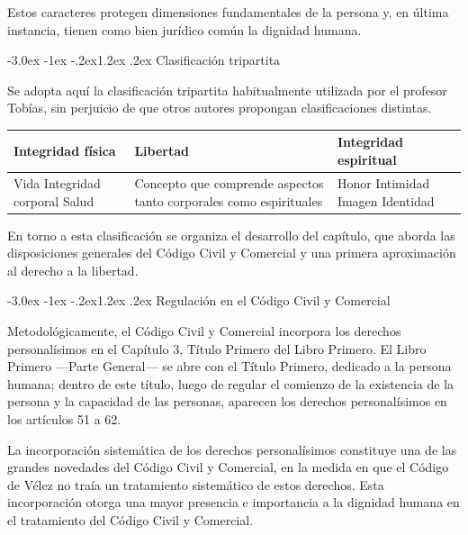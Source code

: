 \documentclass[12pt,oneside]{book}
\makeatletter
\renewcommand\section{\@startsection{section}{1}{\z@}%
  {-3.0ex \@plus -1ex \@minus -.2ex}{1.2ex \@plus .2ex}%
  {\normalfont\large\bfseries\color{acento}}}
\makeatother
\begin{document}
\begin{importante}
Estos caracteres protegen dimensiones fundamentales de la persona y, en última instancia, tienen como bien jurídico común la dignidad humana.
\end{importante}

\section{Clasificación tripartita}

Se adopta aquí la clasificación tripartita habitualmente utilizada por el profesor Tobías, sin perjuicio de que otros autores propongan clasificaciones distintas.

\begin{table}[H]
\centering
\begin{tabular}{p{} p{} p{}}
\toprule
\textbf{Integridad física} & \textbf{Libertad} & \textbf{Integridad espiritual} \\
\midrule
Vida \newline Integridad corporal \newline Salud &
Concepto que comprende aspectos tanto corporales como espirituales &
Honor \newline Intimidad \newline Imagen \newline Identidad \\
\bottomrule
\end{tabular}
\end{table}

En torno a esta clasificación se organiza el desarrollo del capítulo, que aborda las disposiciones generales del Código Civil y Comercial y una primera aproximación al derecho a la libertad.

\section{Regulación en el Código Civil y Comercial}

Metodológicamente, el Código Civil y Comercial incorpora los derechos personalísimos en el Capítulo 3, Título Primero del Libro Primero. El Libro Primero ---Parte General--- se abre con el Título Primero, dedicado a la persona humana; dentro de este título, luego de regular el comienzo de la existencia de la persona y la capacidad de las personas, aparecen los derechos personalísimos en los artículos 51 a 62.

\begin{importante}
La incorporación sistemática de los derechos personalísimos constituye una de las grandes novedades del Código Civil y Comercial, en la medida en que el Código de Vélez no traía un tratamiento sistemático de estos derechos. Esta incorporación otorga una mayor presencia e importancia a la dignidad humana en el tratamiento del Código Civil y Comercial.
\end{importante}
\end{document}
